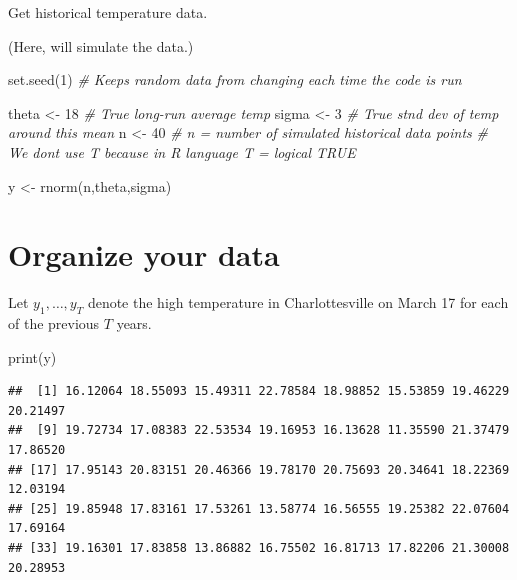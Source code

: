\documentclass[
]{book}
\newenvironment{Shaded}{\begin{snugshade}}{\end{snugshade}}
\newcommand{\CommentTok}[1]{\textcolor[rgb]{0.56,0.35,0.01}{\textit{#1}}}
\newcommand{\DecValTok}[1]{\textcolor[rgb]{0.00,0.00,0.81}{#1}}
\newcommand{\FunctionTok}[1]{\textcolor[rgb]{0.00,0.00,0.00}{#1}}
\newcommand{\NormalTok}[1]{#1}
\newcommand{\OtherTok}[1]{\textcolor[rgb]{0.56,0.35,0.01}{#1}}
\begin{document}
Get historical temperature data.

(Here, will simulate the data.)

\begin{Shaded}
\begin{Highlighting}[]
\FunctionTok{set.seed}\NormalTok{(}\DecValTok{1}\NormalTok{)       }\CommentTok{\# Keeps random data from changing each time the code is run}

\NormalTok{theta }\OtherTok{\textless{}{-}}  \DecValTok{18}      \CommentTok{\# True long{-}run average temp}
\NormalTok{sigma  }\OtherTok{\textless{}{-}}  \DecValTok{3}      \CommentTok{\# True stnd dev of temp around this mean}
\NormalTok{n      }\OtherTok{\textless{}{-}} \DecValTok{40}      \CommentTok{\# n = number of simulated historical data points}
                     \CommentTok{\# We don\textquotesingle{}t use \textquotesingle{}T\textquotesingle{} because in R language \textquotesingle{}T\textquotesingle{} = logical \textquotesingle{}TRUE\textquotesingle{}}

\NormalTok{y }\OtherTok{\textless{}{-}} \FunctionTok{rnorm}\NormalTok{(n,theta,sigma)}
\end{Highlighting}
\end{Shaded}

\hypertarget{organize-your-data}{%
\section{Organize your data}\label{organize-your-data}}

Let \(y_1, \ldots, y_T\) denote the high temperature in Charlottesville on March 17 for each of the previous \(T\) years.

\begin{Shaded}
\begin{Highlighting}[]
\FunctionTok{print}\NormalTok{(y)}
\end{Highlighting}
\end{Shaded}

\begin{verbatim}
##  [1] 16.12064 18.55093 15.49311 22.78584 18.98852 15.53859 19.46229 20.21497
##  [9] 19.72734 17.08383 22.53534 19.16953 16.13628 11.35590 21.37479 17.86520
## [17] 17.95143 20.83151 20.46366 19.78170 20.75693 20.34641 18.22369 12.03194
## [25] 19.85948 17.83161 17.53261 13.58774 16.56555 19.25382 22.07604 17.69164
## [33] 19.16301 17.83858 13.86882 16.75502 16.81713 17.82206 21.30008 20.28953
\end{verbatim}
\end{document}
